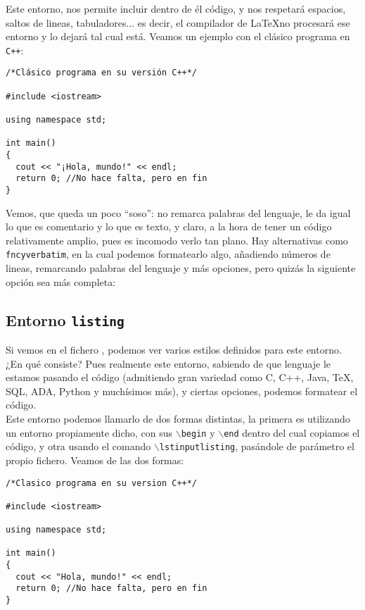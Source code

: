 Este entorno, nos permite incluir dentro de él 
código, y nos respetará espacios, saltos de lineas, tabuladores... es
decir, el compilador de \LaTeX no procesará ese entorno y lo dejará
tal cual está. Veamos un ejemplo con el clásico programa
 en \texttt{C++}:

\begin{verbatim}
/*Clásico programa en su versión C++*/

#include <iostream>

using namespace std;

int main()
{
  cout << "¡Hola, mundo!" << endl;
  return 0; //No hace falta, pero en fin
}
\end{verbatim}

Vemos, que queda un poco ``soso'': no remarca palabras del lenguaje,
le da igual lo que es comentario y lo que es texto, y claro, a la hora
de tener un código relativamente amplio, pues es incomodo verlo tan
plano. Hay alternativas como \texttt{fncyverbatim}, en la cual podemos
formatearlo algo, añadiendo números de lineas, remarcando palabras del
lenguaje y más opciones, pero quizás la siguiente opción sea más
completa:

\subsection{Entorno \texttt{listing}}

Si vemos en el fichero , podemos ver varios
estilos definidos para este entorno. ¿En qué consiste? Pues realmente
este entorno, sabiendo de que lenguaje le estamos pasando el código
(admitiendo gran variedad como C, C++, Java, \TeX, SQL, ADA, Python y
muchísimos más), y ciertas opciones, podemos formatear el código.\\

Este entorno podemos llamarlo de dos formas distintas, la primera es
utilizando un entorno propiamente dicho, con sus
$\backslash$\texttt{begin} y $\backslash$\texttt{end} dentro del cual
copiamos el código, y otra usando el comando
$\backslash$\texttt{lstinputlisting}, pasándole de parámetro el propio
fichero. Veamos de las dos formas:

\begin{lstlisting}[style=C++]
/*Clasico programa en su version C++*/

#include <iostream>

using namespace std;

int main()
{
  cout << "Hola, mundo!" << endl;
  return 0; //No hace falta, pero en fin
}  
\end{lstlisting}

